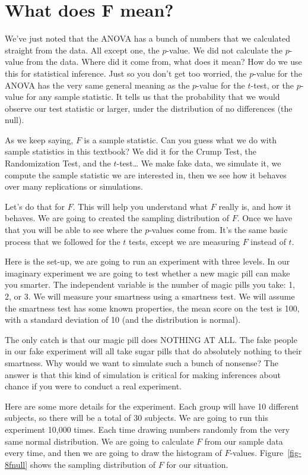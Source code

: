 \documentclass[
  letterpaper,
  DIV=11,
  numbers=noendperiod]{scrreprt}
\begin{document}
\section{What does F mean?}\label{what-does-f-mean}

We've just noted that the ANOVA has a bunch of numbers that we
calculated straight from the data. All except one, the \(p\)-value. We
did not calculate the \(p\)-value from the data. Where did it come from,
what does it mean? How do we use this for statistical inference. Just so
you don't get too worried, the \(p\)-value for the ANOVA has the very
same general meaning as the \(p\)-value for the \(t\)-test, or the
\(p\)-value for any sample statistic. It tells us that the probability
that we would observe our test statistic or larger, under the
distribution of no differences (the null).

As we keep saying, \(F\) is a sample statistic. Can you guess what we do
with sample statistics in this textbook? We did it for the Crump Test,
the Randomization Test, and the \(t\)-test\ldots{} We make fake data, we
simulate it, we compute the sample statistic we are interested in, then
we see how it behaves over many replications or simulations.

Let's do that for \(F\). This will help you understand what \(F\) really
is, and how it behaves. We are going to created the sampling
distribution of \(F\). Once we have that you will be able to see where
the \(p\)-values come from. It's the same basic process that we followed
for the \(t\) tests, except we are measuring \(F\) instead of \(t\).

Here is the set-up, we are going to run an experiment with three levels.
In our imaginary experiment we are going to test whether a new magic
pill can make you smarter. The independent variable is the number of
magic pills you take: 1, 2, or 3. We will measure your smartness using a
smartness test. We will assume the smartness test has some known
properties, the mean score on the test is 100, with a standard deviation
of 10 (and the distribution is normal).

The only catch is that our magic pill does NOTHING AT ALL. The fake
people in our fake experiment will all take sugar pills that do
absolutely nothing to their smartness. Why would we want to simulate
such a bunch of nonsense? The answer is that this kind of simulation is
critical for making inferences about chance if you were to conduct a
real experiment.

Here are some more details for the experiment. Each group will have 10
different subjects, so there will be a total of 30 subjects. We are
going to run this experiment 10,000 times. Each time drawing numbers
randomly from the very same normal distribution. We are going to
calculate \(F\) from our sample data every time, and then we are going
to draw the histogram of \(F\)-values. Figure~\ref{fig-8fnull} shows the
sampling distribution of \(F\) for our situation.
\end{document}
